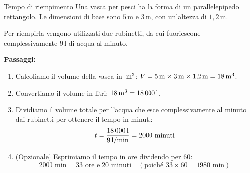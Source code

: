 \begin{esercizio}{Tempo di riempimento}
Una vasca per pesci ha la forma di un parallelepipedo rettangolo. Le dimensioni di base sono $5\,\mathrm{m}$ e $3\,\mathrm{m}$, con un'altezza di $1{,}2\,\mathrm{m}$.

Per riempirla vengono utilizzati due rubinetti, da cui fuoriescono complessivamente $9\,\mathrm{l}$ di acqua al minuto.



\responsespace{7cm}

\begin{soluzione}
  \textbf{Passaggi:}
  \begin{enumerate}
    \item Calcoliamo il volume della vasca in $\,\mathrm{m^3}$: $V = 5\,\mathrm{m} \times 3\,\mathrm{m} \times 1{,}2\,\mathrm{m} = 18\,\mathrm{m^3}$.
    \item Convertiamo il volume in litri: $18\,\mathrm{m^3} = 18\,000\,\mathrm{l}$.
    \item Dividiamo il volume totale per l'acqua che esce complessivamente al minuto dai rubinetti per ottenere il tempo in minuti:
    \[
    t = \frac{18\,000\,\mathrm{l}}{9\,\mathrm{l/min}} = 2000\text{ minuti}
    \]
    \item (Opzionale) Esprimiamo il tempo in ore dividendo per $60$:
    \[
    2000\text{ min} = 33\text{ ore e } 20\text{ minuti} \quad (\text{poiché } 33 \times 60 = 1980\text{ min})
    \]
  \end{enumerate}
\end{soluzione}
\end{esercizio}

\condnewpage

